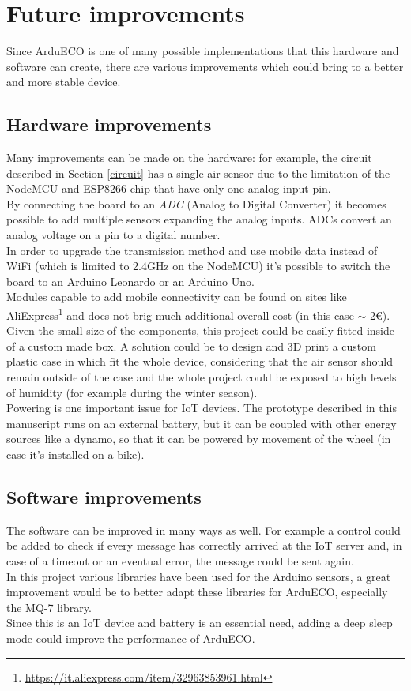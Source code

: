 \documentclass[conference]{IEEEtran}
\begin{document}
\section{Future improvements}\label{improvements}
	Since ArduECO is one of many possible implementations that this hardware and software can create, there are various improvements which could bring to a better and more stable device.
	
	\subsection{Hardware improvements}
		Many improvements can be made on the hardware: for example, the circuit described in Section \ref{circuit} has a single air sensor due to the limitation of the NodeMCU and ESP8266 chip that have only one analog input pin.\\
		By connecting the board to an \textit{ADC} (Analog to Digital Converter) it becomes possible to add multiple sensors expanding the analog inputs.
		ADCs convert an analog voltage on a pin to a digital number\cite{adc}.\\
		In order to upgrade the transmission method and use mobile data instead of WiFi (which is limited to 2.4GHz on the NodeMCU) it's possible to switch the board to an Arduino Leonardo or an Arduino Uno.\\
		Modules capable to add mobile connectivity can be found on sites like AliExpress\footnote{\href{https://it.aliexpress.com/item/32963853961.html}{https://it.aliexpress.com/item/32963853961.html}} and does not brig much additional overall cost (in this case $ \sim $ 2\euro).\\
		Given the small size of the components, this project could be easily fitted inside of a custom made box.
		A solution could be to design and 3D print a custom plastic case in which fit the whole device, considering that the air sensor should remain outside of the case and the whole project could be exposed to high levels of humidity (for example during the winter season).\\
		Powering is one important issue for IoT devices.
		The prototype described in this manuscript runs on an external battery, but it can be coupled with other energy sources like a dynamo, so that it can be powered by movement of the wheel (in case it's installed on a bike).
	
	\subsection{Software improvements}	
		The software can be improved in many ways as well.
		For example a control could be added to check if every message has correctly arrived at the IoT server and, in case of a timeout or an eventual error, the message could be sent again.\\
		In this project various libraries have been used for the Arduino sensors, a great improvement would be to better adapt these libraries for ArduECO, especially the MQ-7 library.\\
		Since this is an IoT device and battery is an essential need, adding a deep sleep mode could improve the performance of ArduECO.
		
\end{document}
